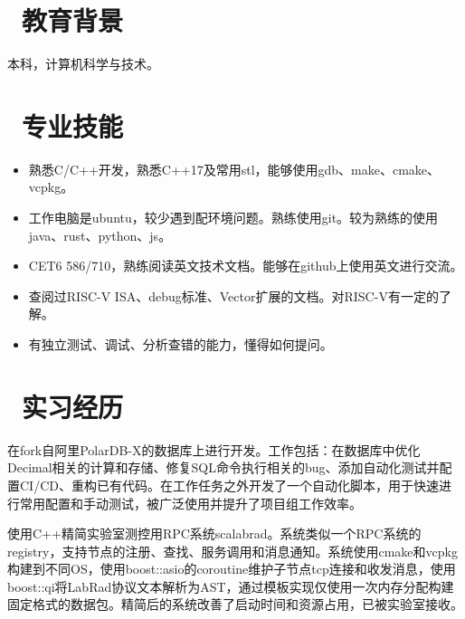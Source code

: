 \documentclass{resume}
\begin{document}



\section{\faGraduationCap\  教育背景}
本科，计算机科学与技术。

\section{\faBook\ 专业技能}
\begin{itemize}[parsep=0.5ex]
  \item 熟悉C/C++开发，熟悉C++17及常用stl，能够使用gdb、make、cmake、vcpkg。
  \item 工作电脑是ubuntu，较少遇到配环境问题。熟练使用git。较为熟练的使用java、rust、python、js。
  \item CET6 586/710，熟练阅读英文技术文档。能够在github上使用英文进行交流。
  \item 查阅过RISC-V ISA、debug标准、Vector扩展的文档。对RISC-V有一定的了解。
  \item 有独立测试、调试、分析查错的能力，懂得如何提问。
\end{itemize}

\newcommand{\customtitle}[2]{\parbox[t]{#1}{\raggedright #2}}

\section{\faUsers\ 实习经历}
\begin{onehalfspacing}
  在fork自阿里PolarDB-X的数据库上进行开发。工作包括：在数据库中优化Decimal相关的计算和存储、修复SQL命令执行相关的bug、添加自动化测试并配置CI/CD、重构已有代码。在工作任务之外开发了一个自动化脚本，用于快速进行常用配置和手动测试，被广泛使用并提升了项目组工作效率。
\end{onehalfspacing}

\begin{onehalfspacing}
  使用C++精简实验室测控用RPC系统scalabrad。系统类似一个RPC系统的registry，支持节点的注册、查找、服务调用和消息通知。系统使用cmake和vcpkg构建到不同OS，使用boost::asio的coroutine维护子节点tcp连接和收发消息，使用boost::qi将LabRad协议文本解析为AST，通过模板实现仅使用一次内存分配构建固定格式的数据包。精简后的系统改善了启动时间和资源占用，已被实验室接收。
\end{onehalfspacing}
\end{document}
